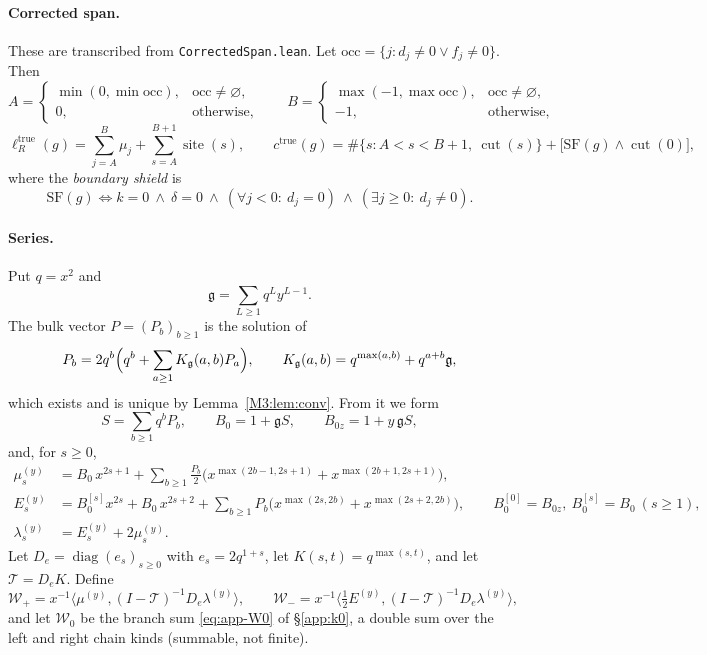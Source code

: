\documentclass[11pt]{article}
\theoremstyle{plain}
\theoremstyle{definition}
\theoremstyle{remark}
\begin{document}
\paragraph{Corrected span.}
These are transcribed from \texttt{CorrectedSpan.lean}. Let
$\mathrm{occ}=\{j:d_j\ne0\vee f_j\ne0\}$. Then
\[
  A=\begin{cases}\min(0,\min\mathrm{occ}),&\mathrm{occ}\neq\varnothing,\\ 0,&\text{otherwise,}\end{cases}
  \qquad
  B=\begin{cases}\max(-1,\max\mathrm{occ}),&\mathrm{occ}\neq\varnothing,\\ -1,&\text{otherwise,}\end{cases}
\]
\[
  \ell_R^{\mathrm{true}}(g)=\sum_{j=A}^{B}\mu_j+\sum_{s=A}^{B+1}\operatorname{site}(s),\qquad
  c^{\mathrm{true}}(g)=\#\{s:A<s<B+1,\ \operatorname{cut}(s)\}
     +\bigl[\mathrm{SF}(g)\wedge\operatorname{cut}(0)\bigr],
\]
where the \emph{boundary shield} is
\[
  \mathrm{SF}(g)\iff k=0\ \wedge\ \delta=0\ \wedge\ (\forall j<0:\ d_j=0)\ \wedge\ (\exists j\ge0:\ d_j\ne0).
\]

\paragraph{Series.}
Put $q=x^2$ and
\[
  \mathfrak g=\sum_{L\ge1}q^Ly^{L-1}.
\]
The bulk vector $P=(P_b)_{b\ge1}$ is the solution of
\begin{equation}\label{eq:app-bulk}
  P_b=2q^b\Bigl(q^b+\sum_{a\ge1}K_{\mathfrak g}(a,b)P_a\Bigr),\qquad
  K_{\mathfrak g}(a,b)=q^{\max(a,b)}+q^{a+b}\mathfrak g ,
\end{equation}
which exists and is unique by Lemma~\ref{M3:lem:conv}. From it we form
\[
  S=\sum_{b\ge1}q^bP_b,\qquad B_0=1+\mathfrak gS,\qquad B_{0z}=1+y\,\mathfrak gS,
\]
and, for $s\ge0$,
\begin{align}
  \mu^{(y)}_s&=B_0\,x^{2s+1}+\sum_{b\ge1}\frac{P_b}{2}\bigl(x^{\max(2b-1,2s+1)}+x^{\max(2b+1,2s+1)}\bigr),
  \label{eq:app-mu}\\
  E^{(y)}_s&=B_0^{[s]}x^{2s}+B_0\,x^{2s+2}+\sum_{b\ge1}P_b\bigl(x^{\max(2s,2b)}+x^{\max(2s+2,2b)}\bigr),
  \qquad B_0^{[0]}=B_{0z},\ B_0^{[s]}=B_0\ (s\ge1),\label{eq:app-E}\\
  \lambda^{(y)}_s&=E^{(y)}_s+2\mu^{(y)}_s .\label{eq:app-lambda}
\end{align}
Let $D_e=\operatorname{diag}(e_s)_{s\ge0}$ with $e_s=2q^{1+s}$, let $K(s,t)=q^{\max(s,t)}$,
and let $\mathcal T=D_eK$. Define
\[
  \mathcal W_+=x^{-1}\bigl\langle\mu^{(y)},(I-\mathcal T)^{-1}D_e\lambda^{(y)}\bigr\rangle,\qquad
  \mathcal W_-=x^{-1}\bigl\langle\tfrac12E^{(y)},(I-\mathcal T)^{-1}D_e\lambda^{(y)}\bigr\rangle,
\]
and let $\mathcal W_0$ be the branch sum \eqref{eq:app-W0} of \S\ref{app:k0}, a double sum over the
left and right chain kinds (summable, not finite).
\end{document}
